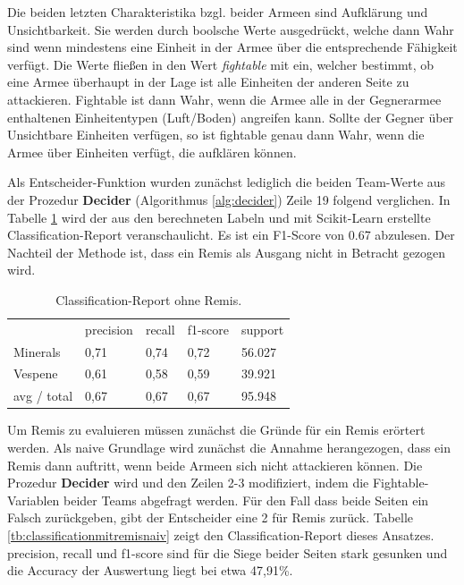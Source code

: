 Die beiden letzten Charakteristika bzgl. beider Armeen sind Aufklärung und Unsichtbarkeit. Sie werden durch boolsche Werte ausgedrückt, welche dann Wahr sind wenn mindestens eine Einheit in der Armee über die entsprechende Fähigkeit verfügt. Die Werte fließen in den Wert \textit{fightable} mit ein, welcher bestimmt, ob eine Armee überhaupt in der Lage ist alle Einheiten der anderen Seite zu attackieren. Fightable ist dann Wahr, wenn die Armee alle in der Gegnerarmee enthaltenen Einheitentypen (Luft/Boden) angreifen kann. Sollte der Gegner über Unsichtbare Einheiten verfügen, so ist fightable genau dann Wahr, wenn die Armee über Einheiten verfügt, die aufklären können.

Als Entscheider-Funktion wurden zunächst lediglich die beiden Team-Werte aus der Prozedur \textbf{Decider} (Algorithmus \ref{alg:decider}) Zeile 19 folgend verglichen. In Tabelle \ref{tb:classificationohneremis} wird der aus den berechneten Labeln und mit Scikit-Learn erstellte Classification-Report veranschaulicht. Es ist ein F1-Score von 0.67 abzulesen. Der Nachteil der Methode ist, dass ein Remis als Ausgang nicht in Betracht gezogen wird.  

\begin{table}
\centering
\caption{Classification-Report ohne Remis.}
\begin{tabular}{@{}lllll@{}}
\hline
& precision & recall & f1-score & support\\
Minerals & 0,71 & 0,74 & 0,72 & 56.027\\
Vespene & 0,61 & 0,58 & 0,59 & 39.921\\
 avg / total & 0,67 & 0,67 & 0,67 & 95.948\\
\hline
\end{tabular}
\label{tb:classificationohneremis}
\end{table}

Um Remis zu evaluieren müssen zunächst die Gründe für ein Remis erörtert werden. Als naive Grundlage wird zunächst die Annahme herangezogen, dass ein Remis dann auftritt, wenn beide Armeen sich nicht attackieren können. Die Prozedur \textbf{Decider} wird und den Zeilen 2-3 modifiziert, indem die Fightable-Variablen beider Teams abgefragt werden. Für den Fall dass beide Seiten ein Falsch zurückgeben, gibt der Entscheider eine 2 für Remis zurück. Tabelle \ref{tb:classificationmitremisnaiv} zeigt den Classification-Report dieses Ansatzes.  precision, recall und f1-score sind für die Siege beider Seiten stark gesunken und die Accuracy der Auswertung liegt bei etwa 47,91\%.  

